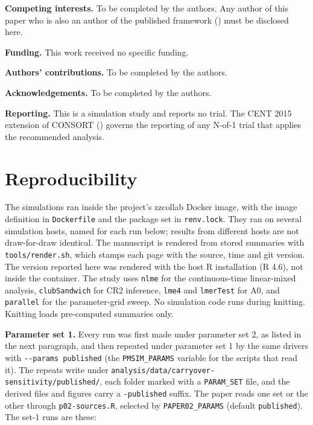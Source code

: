 \documentclass[
  11pt,
]{article}
\begin{document}
\textbf{Competing interests.} To be completed by the authors. Any author
of this paper who is also an author of the published framework
() must be disclosed here.

\textbf{Funding.} This work received no specific funding.

\textbf{Authors' contributions.} To be completed by the authors.

\textbf{Acknowledgements.} To be completed by the authors.

\textbf{Reporting.} This is a simulation study and reports no trial. The
CENT 2015 extension of CONSORT () governs the reporting
of any N-of-1 trial that applies the recommended analysis.

\section{Reproducibility}\label{sec-repro}

The simulations ran inside the project's zzcollab Docker image, with
the image definition in \texttt{Dockerfile} and the package set in
\texttt{renv.lock}. They ran on several simulation hosts, named for each run
below; results from different hosts are not draw-for-draw identical.
The manuscript is rendered from stored summaries with
\texttt{tools/render.sh}, which stamps each page with the source, time and
git version. The version reported here was rendered with the host R
installation (R 4.6), not inside the container. The study uses \texttt{nlme} for the continuous-time
linear-mixed analysis, \texttt{clubSandwich} for CR2 inference, \texttt{lme4} and
\texttt{lmerTest} for A0, and \texttt{parallel} for the parameter-grid sweep. No
simulation code runs during knitting. Knitting loads pre-computed
summaries only.

\textbf{Parameter set 1.} Every run was first made under parameter set 2,
as listed in the next paragraph, and then repeated under parameter
set 1 by the same drivers with \texttt{-\/-params\ published} (the
\texttt{PMSIM\_PARAMS} variable for the scripts that read it). The repeats
write under \texttt{analysis/data/carryover-sensitivity/published/}, each
folder marked with a \texttt{PARAM\_SET} file, and the derived files and
figures carry a \texttt{-published} suffix. The paper reads one set or the
other through \texttt{p02-sources.R}, selected by \texttt{PAPER02\_PARAMS} (default
\texttt{published}). The set-1 runs are these:
\end{document}

